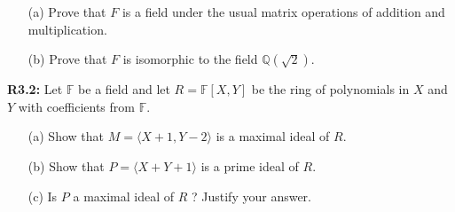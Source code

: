 \begin{itemize}
	\item[(a)] Prove that $F$ is a field under the usual matrix operations of addition and multiplication.
	\item[(b)] Prove that $F$ is isomorphic to the field $\mathbb{Q}(\sqrt{2})$.
\end{itemize}
\textbf{R3.2:} Let $\mathbb{F}$ be a field and let $R=\mathbb{F}[X, Y]$ be the ring of polynomials in $X$ and $Y$ with coefficients from $\mathbb{F}$.
\begin{itemize}
	\item[(a)] Show that $M=\langle X+1, Y-2\rangle$ is a maximal ideal of $R$.
	\item[(b)] Show that $P=\langle X+Y+1\rangle$ is a prime ideal of $R$.
	\item[(c)] Is $P$ a maximal ideal of $R$ ? Justify your answer.
\end{itemize}

